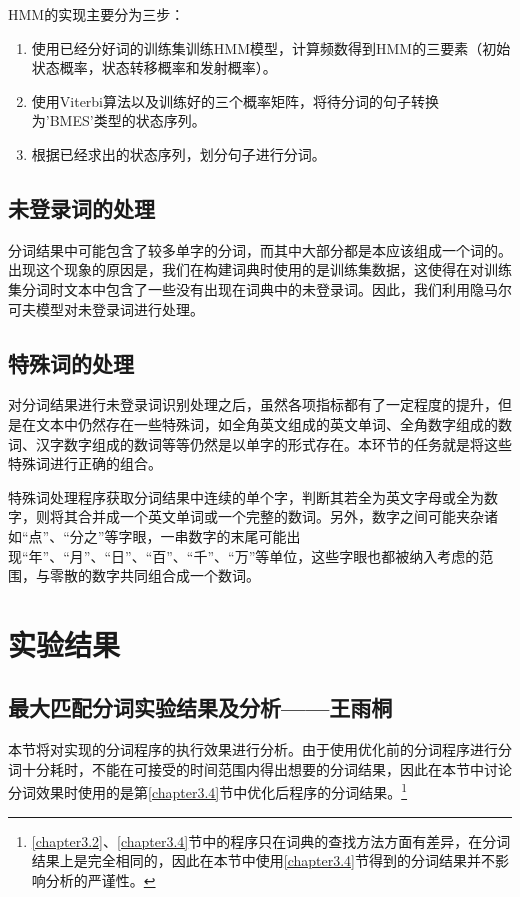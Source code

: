 \documentclass[11pt,a4paper]{article}
\begin{document}
	HMM的实现主要分为三步：
	
	\begin{enumerate}
		\item 使用已经分好词的训练集训练HMM模型，计算频数得到HMM的三要素（初始状态概率，状态转移概率和发射概率）。
		\item 使用Viterbi算法以及训练好的三个概率矩阵，将待分词的句子转换为'BMES'类型的状态序列。
		\item 根据已经求出的状态序列，划分句子进行分词。
	\end{enumerate}
	
	\subsection{未登录词的处理}
	分词结果中可能包含了较多单字的分词，而其中大部分都是本应该组成一个词的。出现这个现象的原因是，我们在构建词典时使用的是训练集数据，这使得在对训练集分词时文本中包含了一些没有出现在词典中的未登录词。因此，我们利用隐马尔可夫模型对未登录词进行处理。
	
	\subsection{特殊词的处理}
	对分词结果进行未登录词识别处理之后，虽然各项指标都有了一定程度的提升，但是在文本中仍然存在一些特殊词，如全角英文组成的英文单词、全角数字组成的数词、汉字数字组成的数词等等仍然是以单字的形式存在。本环节的任务就是将这些特殊词进行正确的组合。
	
	特殊词处理程序获取分词结果中连续的单个字，判断其若全为英文字母或全为数字，则将其合并成一个英文单词或一个完整的数词。另外，数字之间可能夹杂诸如“点”、“分之”等字眼，一串数字的末尾可能出现“年”、“月”、“日”、“百”、“千”、“万”等单位，这些字眼也都被纳入考虑的范围，与零散的数字共同组合成一个数词。
	
	
	
	
	
	
	
	
	\section{实验结果}
	\subsection{最大匹配分词实验结果及分析——王雨桐}\label{wyt_analyzation}
	\noindent
	本节将对实现的分词程序的执行效果进行分析。由于使用优化前的分词程序进行分词十分耗时，不能在可接受的时间范围内得出想要的分词结果，因此在本节中讨论分词效果时使用的是第\ref{chapter3.4}节中优化后程序的分词结果。\footnote{\ref{chapter3.2}、\ref{chapter3.4}节中的程序只在词典的查找方法方面有差异，在分词结果上是完全相同的，因此在本节中使用\ref{chapter3.4}节得到的分词结果并不影响分析的严谨性。}
	
\end{document}
